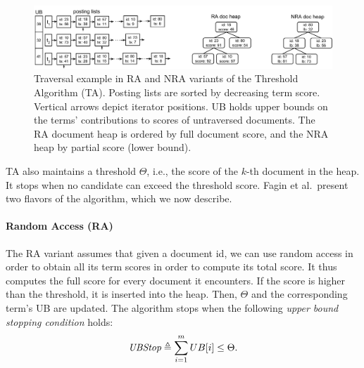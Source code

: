

\begin{figure}[tbh]
\centering
\includegraphics[width=0.95\linewidth]{figures/postingsLists}
\caption{Traversal example in  RA and NRA variants of the Threshold Algorithm (TA). Posting lists are sorted by decreasing term score. Vertical arrows depict  iterator positions.  UB  holds upper bounds on the terms' contributions to scores of untraversed documents. The RA document heap is ordered by full document score, and the NRA heap  by partial score (lower bound).}
\label{fig:lists}
\end{figure}

TA also maintains a threshold $\Theta$, i.e., the score of the $k$-th document in the heap.
It stops when no candidate can exceed the threshold score. 
Fagin et al.\ present two flavors of the algorithm, which we now describe.

\paragraph{Random Access (RA)} 
The RA variant assumes that given a document id, we can use random access in order to obtain all its term scores in order to compute its total score. It thus computes the full score for every document it encounters. If the score is higher than the threshold, it is inserted into the heap. Then, $\Theta$ and the corresponding term's UB are updated. The algorithm stops when 
the following \emph{upper bound stopping condition} holds:
\begin{equation} \label{eq:stop}
\textit{UBStop} \triangleq \sum_{i=1}^m UB[i] \le \Theta.
\end{equation}

